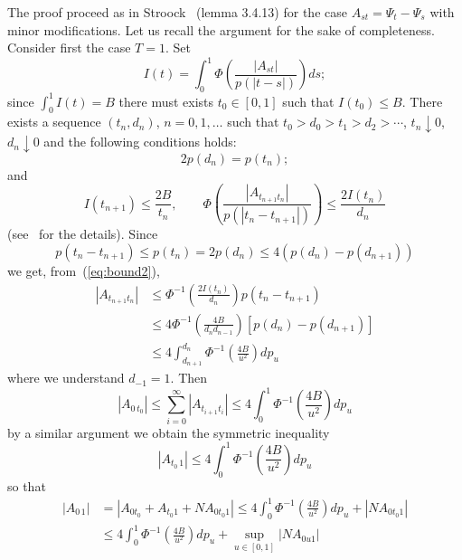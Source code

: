 \documentclass[a4paper,12pt,reqno]{amsproc}
\newcommand{\NN}{N}
\begin{document}
\proof
The proof proceed as in Stroock~\cite{stroock} (lemma 3.4.13) for the
case $A_{st} = \Psi_t -\Psi_s$ with minor modifications. 
Let us recall the argument for the
sake of completeness. Consider first the case $T=1$. Set 
$$
I(t) = \int_0^1 \Phi\left(\frac{|A_{st}|}{p(|t-s|)}\right) ds;
$$ 
since $\int_0^1 I(t) = B$ there must exists $t_0 \in[0,1]$ such that
$I(t_0) \le B$. There exists a sequence $(t_n,d_n)$, $n=0,1,\dots$
such that $t_0 > d_0 > t_1 > d_2 > \cdots$, $t_n \downarrow 0$, $d_n
\downarrow 0$ and the following
conditions holds:
\begin{equation}
  \label{eq:bound1}
2 p(d_n) = p(t_n);  
\end{equation}
and
\begin{equation}
  \label{eq:bound2}
I(t_{n+1}) \le \frac{2B}{t_n},\qquad \Phi\left(\frac{|A_{t_{n+1}
      t_n}|}{p(|t_{n}-t_{n+1}|)}\right) \le \frac{2 I(t_{n})}{d_n}  
\end{equation}
(see~\cite{stroock} for the details).
Since
$$
p(t_n - t_{n+1}) \le p(t_n) = 2 p(d_n) \le 4(p(d_n)-p(d_{n+1}))
$$
we get, from~(\ref{eq:bound2}),
\begin{equation*}
  \begin{split}
 |A_{t_{n+1} t_n}| & \le \Phi^{-1}\left(\frac{2 I(t_n)}{d_n}\right)
  p(t_n-t_{n+1})    
\\ & \le 4
\Phi^{-1}\left(\frac{4 B}{d_n d_{n-1}}\right)
  [p(d_n)-p(d_{n+1})   ]
\\ & \le 4 \int_{d_{n+1}}^{d_n} \Phi^{-1}\left(\frac{4 B}{u^2}\right) dp_u
  \end{split}
\end{equation*}
where we understand $d_{-1}=1$. Then
\begin{equation*}
  |A_{0\, t_0}| \le \sum_{i=0}^\infty |A_{t_{i+1} t_i}| \le  4 \int_{0}^{1} \Phi^{-1}\left(\frac{4 B}{u^2}\right) dp_u 
\end{equation*}
by a similar argument we obtain the symmetric inequality
\begin{equation*}
  |A_{t_0\,1}|  \le  4 \int_{0}^{1} \Phi^{-1}\left(\frac{4 B}{u^2}\right) dp_u 
\end{equation*}
so that
\begin{equation*}
  \begin{split}
 |A_{0\,1}| & = |A_{0 t_0} + A_{t_0 1} + \NN A_{0 t_0 1}| \le
   4 \int_{0}^{1} \Phi^{-1}\left(\frac{4 B}{u^2}\right) dp_u  +  |\NN
   A_{0 t_0 1}|
\\ & \le    4 \int_{0}^{1} \Phi^{-1}\left(\frac{4 B}{u^2}\right) dp_u
   +  \sup_{u\in[0,1]}|\NN
   A_{0 u 1}|
      \end{split}
\end{equation*}
\end{document}
